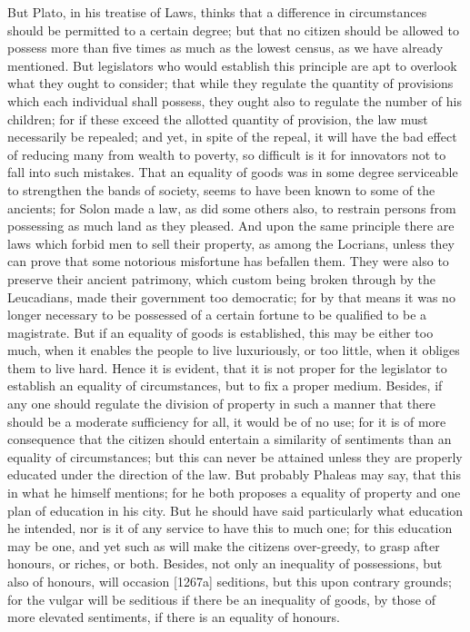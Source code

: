But Plato, in his treatise of Laws, thinks that a difference in
circumstances should be permitted to a certain degree; but that no citizen
should be allowed to possess more than five times as much as the lowest
census, as we have already mentioned. But legislators who would establish
this principle are apt to overlook what they ought to consider; that while
they regulate the quantity of provisions which each individual shall
possess, they ought also to regulate the number of his children; for if
these exceed the allotted quantity of provision, the law must necessarily
be repealed; and yet, in spite of the repeal, it will have the bad effect
of reducing many from wealth to poverty, so difficult is it for innovators
not to fall into such mistakes. That an equality of goods was in some
degree serviceable to strengthen the bands of society, seems to have been
known to some of the ancients; for Solon made a law, as did some others
also, to restrain persons from possessing as much land as they pleased.
And upon the same principle there are laws which forbid men to sell their
property, as among the Locrians, unless they can prove that some notorious
misfortune has befallen them. They were also to preserve their ancient
patrimony, which custom being broken through by the Leucadians, made their
government too democratic; for by that means it was no longer necessary to
be possessed of a certain fortune to be qualified to be a magistrate. But
if an equality of goods is established, this may be either too much, when
it enables the people to live luxuriously, or too little, when it obliges
them to live hard. Hence it is evident, that it is not proper for the
legislator to establish an equality of circumstances, but to fix a proper
medium. Besides, if any one should regulate the division of property in
such a manner that there should be a moderate sufficiency for all, it
would be of no use; for it is of more consequence that the citizen should
entertain a similarity of sentiments than an equality of circumstances;
but this can never be attained unless they are properly educated under the
direction of the law. But probably Phaleas may say, that this in what he
himself mentions; for he both proposes a equality of property and one plan
of education in his city. But he should have said particularly what
education he intended, nor is it of any service to have this to much one;
for this education may be one, and yet such as will make the citizens
over-greedy, to grasp after honours, or riches, or both. Besides, not only
an inequality of possessions, but also of honours, will occasion [1267a]
seditions, but this upon contrary grounds; for the vulgar will be
seditious if there be an inequality of goods, by those of more elevated
sentiments, if there is an equality of honours.

